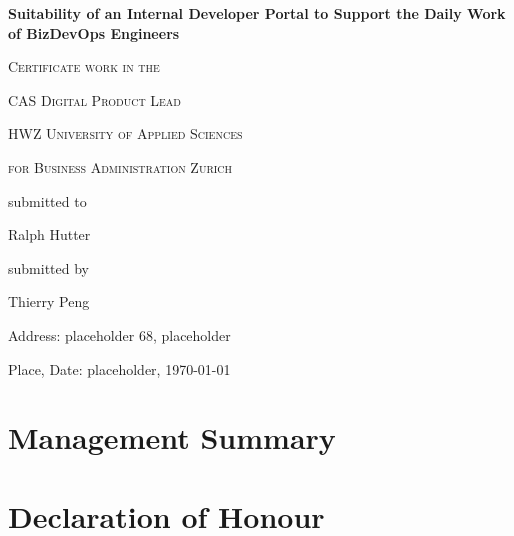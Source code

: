 \documentclass[a4paper,12pt]{article}
\begin{document}
    \begin{titlepage}
        \begin{center}
        {\huge\bfseries Suitability of an Internal Developer Portal to Support the Daily Work of BizDevOps Engineers\par}
            \vspace{2cm}

            {\scshape\large Certificate work in the \par}
            {\scshape\large CAS Digital Product Lead \par}
            \vspace{1cm}

            {\scshape\large HWZ University of Applied Sciences \par}
            {\scshape\large for Business Administration Zurich \par}
            \vspace{4cm}

            {\normalsize submitted to\par}
            \vspace{0.5cm}

            {\large Ralph Hutter\par}
            \vfill
            {\normalsize submitted by\par}
            \vspace{0.5cm}
            {\large Thierry Peng\par}
            \vspace{0.5cm}
            {\normalsize Address: placeholder 68, placeholder\par}
            {\normalsize  Place, Date: placeholder, \today\par}

        \end{center}
    \end{titlepage}


    \section*{Management Summary}
    \pagebreak


    \tableofcontents
    \pagebreak


    \section*{Declaration of Honour}
\end{document}
